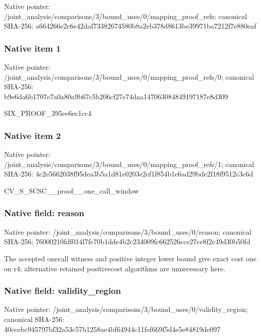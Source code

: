 \documentclass[10pt,a4paper]{article}
\begin{document}
Native pointer: /joint\_analysis/comparis\allowbreak{}ons/3/bound\_uses/0/mappi\allowbreak{}ng\_proof\_refs; canonical SHA-256: a664266e2c6e42daf7338267\allowbreak{}4580b8a2eb378d8613be3997\allowbreak{}1ba7212f7e880eaf



\subsubsection{Native item 1}


Native pointer: /joint\_analysis/comparis\allowbreak{}ons/3/bound\_uses/0/mappi\allowbreak{}ng\_proof\_refs/0; canonical SHA-256: b9e6da6b1707e7a0a80a9b67\allowbreak{}c5b206cf27e74daa14706308\allowbreak{}4849197187e8d309


SIX\_PROOF\_395ee6ec1cc4


\subsubsection{Native item 2}


Native pointer: /joint\_analysis/comparis\allowbreak{}ons/3/bound\_uses/0/mappi\allowbreak{}ng\_proof\_refs/1; canonical SHA-256: 4c2e5662038f95dea3b5a1d8\allowbreak{}1e0203e2ef1f854b1e6ad29b\allowbreak{}de2f18f9512c3c6d


CV\_S\_SCSC\_\_proof\_\_one\_call\_window


\subsubsection{Native field: reason}


Native pointer: /joint\_analysis/comparis\allowbreak{}ons/3/bound\_uses/0/reaso\allowbreak{}n; canonical SHA-256: 76000210fdf014f7fc70b1dd\allowbreak{}e4b2c234009fc662526cce27\allowbreak{}ce8f2c49d30b50fd


The accepted onecall witness and positive integer lower bound give exact cost one on r4; alternative retained positivecost algorithms are unnecessary here.


\subsubsection{Native field: validity\_region}


Native pointer: /joint\_analysis/comparis\allowbreak{}ons/3/bound\_uses/0/valid\allowbreak{}ity\_region; canonical SHA-256: 40ccebc945797bf32a53c57b\allowbreak{}1258ae4bf64944c11fef669f\allowbreak{}5d4e5e84819de097
\end{document}
